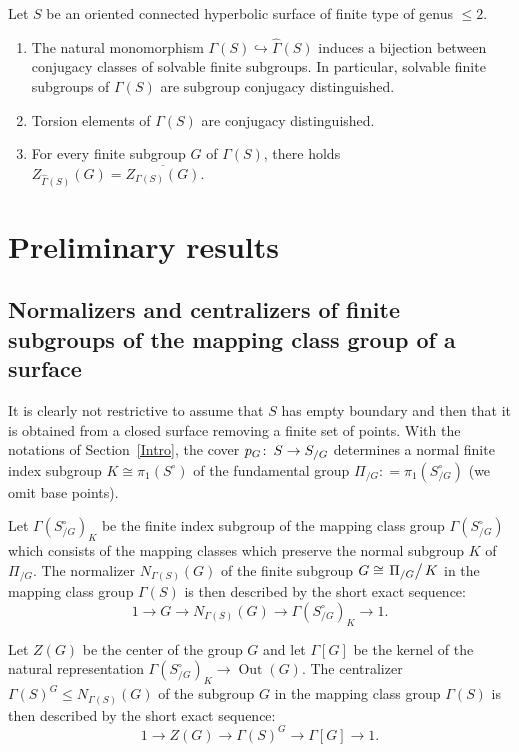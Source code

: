 \documentclass[12pt,twoside]{amsart}
\newenvironment{customtheorem}[1]
  {\renewcommand\theinnercustomthm{#1}\innercustomthm}
  {\endinnercustomthm}
\theoremstyle{definition}
\def\Out{\operatorname{Out}}
\def\dd{\partial}
\def\G{{\Gamma}}
\def\hG{{\widehat\Gamma}}
\def\ol{\overline}
\def\hookra{\hookrightarrow}
\def\co{\colon\thinspace}
\begin{document}
\begin{customtheorem}{C}Let $S$ be an oriented connected hyperbolic surface of finite type of genus $\leq 2$. %
\begin{enumerate}
\item The natural monomorphism $\G(S)\hookra\hG(S)$ induces a bijection between conjugacy classes
of solvable finite subgroups. In particular, solvable finite subgroups of $\G(S)$ are subgroup conjugacy distinguished. 
\item Torsion elements of $\G(S)$ are conjugacy distinguished.
\item For every finite subgroup $G$ of $\G(S)$, there holds $Z_{\hG(S)}(G)=\ol{Z_{\G(S)}(G)}$.\\ 
\end{enumerate}
\end{customtheorem}

 


\section{Preliminary results}
\subsection{Normalizers and centralizers of finite subgroups of the mapping class group of a surface}\label{centrasec}
It is clearly not restrictive to assume that $S$ has empty boundary and then that it is obtained from a closed surface removing a finite set of points.
With the notations of Section~\ref{Intro}, the cover $p_G\co S\to S_{/G}$ determines a normal finite index subgroup $K\cong\pi_1(S^\circ)$ 
of the fundamental group $\Pi_{/G}: =\pi_1(S_{/G}^\circ)$ (we omit base points). 

Let $\G(S_{/G}^\circ)_K$ be the finite index subgroup of the mapping class group $\G(S_{/G}^\circ)$ which consists of the mapping classes which 
preserve the normal subgroup $K$ of $\Pi_{/G}$. The normalizer $N_{\G(S)}(G)$ of the finite subgroup $G\cong\left.\Pi_{/G}\right/K$ 
in the mapping class group $\G(S)$ is then described by the short exact sequence:
\begin{equation}\label{normalizerG}
1\to G\to N_{\G(S)}(G)\to\G(S_{/G}^\circ)_K\to 1.
\end{equation}

Let $Z(G)$ be the center of the group $G$ and let $\G[G]$ be the kernel of the natural representation $\G(S_{/G}^\circ)_K\to\Out(G)$.
The centralizer $\G(S)^G\leq N_{\G(S)}(G)$ of the subgroup $G$ in the mapping class group $\G(S)$ 
is then described by the short exact sequence:
\begin{equation}\label{centralizerG}
1\to Z(G)\to\G(S)^G\to\G[G]\to 1.
\end{equation}
\end{document}
